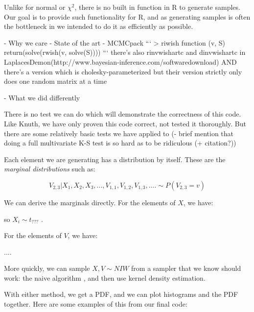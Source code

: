 \documentclass[english]{report}
\begin{document}
Unlike for normal or $\chi^2$, there is no built in function in R to generate samples. Our goal is to provide such functionality for R, and as generating samples is often the bottleneck in %
	we intended to do it as efficiently as possible.


- Why we care
- State of the art
  - MCMCpack
  ```
  > riwish
  function (v, S) 
  {
      return(solve(rwish(v, solve(S))))
      }
   ```   
 there's also rinvwishartc and dinvwishartc in LaplacesDemon(http://www.bayesian-inference.com/softwaredownload) 
   AND there's a version which is cholesky-parameterized
  but their version strictly only does one random matrix at a time
  
- What we did differently



There is no test we can do which will demonstrate the correctness of this code.
Like Knuth, we have only proven this code correct, not tested it thoroughly.
But there are some relatively basic tests we have applied to 
(- brief mention that doing a full multivariate K-S test is so hard as to be ridiculous (+ citation?))

Each element we are generating has a distribution by itself. These are the \emph{marginal distributions} such as:

$$ V_{2,3} | X_1, X_2, X_3, ..., V_{1,1}, V_{1,2}, V_{1,3} , ....  \sim P(V_{2,3} = v) $$

We can derive the marginals directly. For the elements of $X$, we have:


so  $X_i \sim t_{???}$ .

For the elements of $V$, we have:

....


More quickly, we can sample $X,V \sim NIW$ from a sampler that we know should work: the naive algorithm %
  , and then use kernel density estimation.
  
With either method, we get a PDF, and we can plot histograms and the PDF together. Here are some examples of this from our final code:
\end{document}
